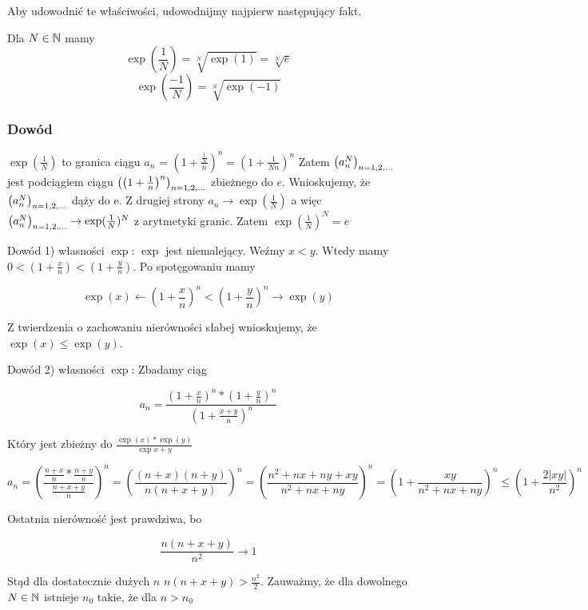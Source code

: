 \documentclass[9pt]{article}
\begin{document}
Aby udowodnić te właściwości, udowodnijmy najpierw następujący fakt.
\begin{Lem}
    Dla $N \in \mathbb{N}$ mamy
    \[
        \exp\left(\frac{1}{N}\right) = 
        \sqrt[N]{\exp(1)} = \sqrt[N]{e}
    \]
    \[
        \exp\left(\frac{-1}{N}\right) = 
        \sqrt[N]{\exp(-1)}
    \]
\end{Lem}

\subsubsection*{Dowód}

$\exp\left(\frac{1}{N}\right)$ to granica ciągu $a_n$ = $\left(1 + \frac{\frac{1}{N}}{n}\right)^n =
\left(1 + \frac{1}{Nn}\right)^n$ Zatem $\left(a_n^N\right)_{n = 1,2,...}$ jest podciągiem ciągu
$\left(\left(1+\frac{1}{n}\right)^n\right)_{n = 1,2,...}$ zbieżnego do $e$. Wnioskujemy, że $\left(a_n^N\right)_{n = 1,2,...}$ dąży do e. Z
drugiej strony $a_n \to \exp\left(\frac{1}{N}\right)$ a więc $\left(a_n^N\right)_{n = 1,2,...} \to \exp(\frac{1}{N})^N$ z
arytmetyki granic. Zatem $\exp\left(\frac{1}{N}\right)^N = e$

\bigbreak

Dowód 1) własności $\exp$: $\exp$ jest niemalejący. Weźmy $x < y$. Wtedy mamy $0 < \left(1 +
\frac{x}{n}\right) < \left(1 + \frac{y}{n}\right)$. Po spotęgowaniu mamy

\[
    \exp(x) \leftarrow \left(1+\frac{x}{n}\right)^n < \left(1 + \frac{y}{n}\right)^n \to \exp (y)
\]

Z twierdzenia o zachowaniu nierówności słabej wnioskujemy, że $\exp(x) \le \exp(y)$.

\bigbreak

Dowód 2) własności $\exp$: Zbadamy ciąg

\[
    a_n = \frac{\left(1 + \frac{x}{n}\right)^n * \left(1 + \frac{y}{n}\right)^n}{\left(1+\frac{x+y}{n}\right)^n}
\]

Który jest zbieżny do $\frac{\exp(x)*\exp(y)}{\exp{x+y}}$

\[
    a_n = \left(\frac{\frac{n+x}{n} * \frac{n+y}{n}}{\frac{n+x+y}{n}}\right)^n
    = \left(\frac{(n+x)(n+y)}{n(n+x+y)}\right)^n = \left(\frac{n^2 + nx + ny + xy}{n^2 + nx + ny}\right)^n
    = \left(1 + \frac{xy}{n^2 + nx + ny}\right)^n \le \left(1 + \frac{2|xy|}{n^2}\right)^n
\]

Ostatnia nierówność jest prawdziwa, bo

\[
    \frac{n(n+x+y)}{n^2} \to 1
\]

Stąd dla dostatecznie dużych $n$ $n(n+x+y) > \frac{n^2}{2}$. Zauważmy, że dla dowolnego $N \in \mathbb{N}$
istnieje $n_0$ takie, że dla $n > n_0$
\end{document}
